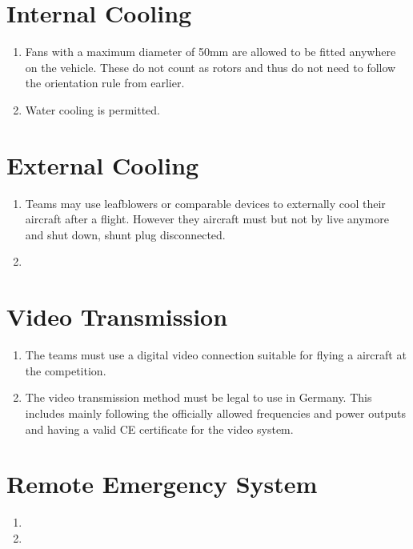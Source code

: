 \documentclass{article}
\begin{document}
\section{Internal Cooling}
\begin{enumerate}
  \item Fans with a maximum diameter of 50mm are allowed to be fitted anywhere on the vehicle. These do not count as rotors and thus do not need to follow the orientation rule from earlier.
  \item Water cooling is permitted. 
\end{enumerate}

\section{External Cooling}
\begin{enumerate}
  \item Teams may use leafblowers or comparable devices to externally cool their aircraft after a flight. However they aircraft must but not by live anymore and shut down, shunt plug disconnected.  
  \item 
\end{enumerate}

\section{Video Transmission}
\begin{enumerate}
  \item The teams must use a digital video connection suitable for flying a aircraft at the competition.  
  \item The video transmission method must be legal to use in Germany. This includes mainly following the officially allowed frequencies and power outputs and having a valid CE certificate for the video system.
\end{enumerate}


\section{Remote Emergency System}
\begin{enumerate}
  \item 
  \item 
\end{enumerate}
\end{document}
